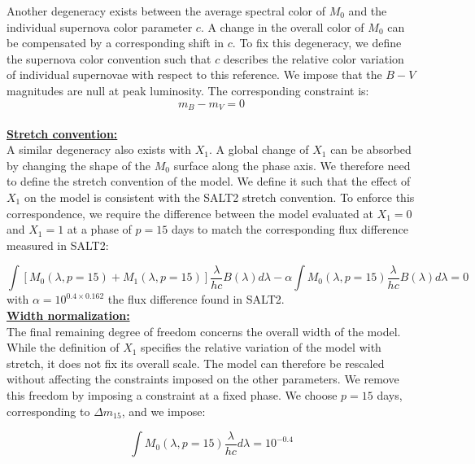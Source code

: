 Another degeneracy exists between the average spectral color of $M_0$ and the individual supernova color parameter $c$. A change in the overall color of 
$M_0$ can be compensated by a corresponding shift in $c$. To fix this degeneracy, we define the supernova color convention such that $c$ describes the relative 
color variation of individual supernovae with respect to this reference. We impose that the $B-V$ magnitudes are null at peak luminosity. 
The corresponding constraint is:
\begin{equation}
m_B - m_V = 0
\end{equation}
\\

\noindent \textbf{\underline{Stretch convention:}} \\

A similar degeneracy also exists with $X_1$. A global change of $X_1$ can be absorbed by changing the shape of the $M_0$ surface along the phase axis. 
We therefore need to define the stretch convention of the model. 
We define it such that the effect of $X_1$ on the model is consistent with the SALT2 stretch convention. 
To enforce this correspondence, we require the difference between the model evaluated at $X_1=0$ and $X_1=1$ at a 
phase of $p=15$ days to match the corresponding flux difference measured in SALT2:

\begin{equation}
    \int \left[M_0(\lambda, p=15) + M_1(\lambda, p=15) \right] \frac{\lambda}{hc}B(\lambda) d\lambda - \alpha \int M_0(\lambda, p=15) \frac{\lambda}{hc}B(\lambda) d\lambda = 0
\end{equation}
with $\alpha = 10^{0.4 \times 0.162}$ the flux difference found in SALT2. \\

\noindent \textbf{\underline{Width normalization:}} \\

The final remaining degree of freedom concerns the overall width of the model. While the definition of $X_1$ specifies the relative variation of the model with stretch, 
it does not fix its overall scale. The model can therefore be rescaled without affecting the constraints imposed on the other parameters. We remove this freedom by 
imposing a constraint at a fixed phase. We choose $p=15$ days, corresponding to $\Delta m_{15}$, and we impose:

\begin{equation}
    \int M_0(\lambda, p=15) \frac{\lambda}{hc} d\lambda = 10^{-0.4}
\end{equation} \\


